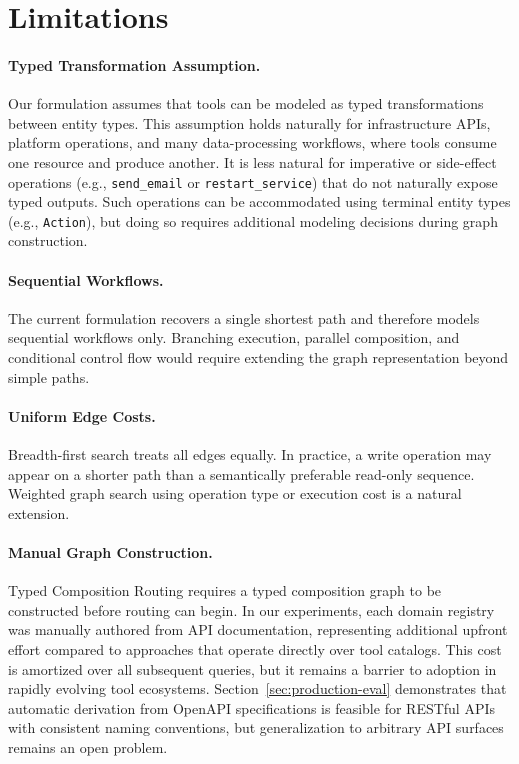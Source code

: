 \section{Limitations}
\label{sec:limitations}

\paragraph{Typed Transformation Assumption.}

Our formulation assumes that tools can be modeled as typed transformations between entity types.
This assumption holds naturally for infrastructure APIs, platform operations, and many data-processing workflows, where tools consume one resource and produce another.
It is less natural for imperative or side-effect operations (e.g., \texttt{send\_email} or \texttt{restart\_service}) that do not naturally expose typed outputs.
Such operations can be accommodated using terminal entity types (e.g., \texttt{Action}), but doing so requires additional modeling decisions during graph construction.

\paragraph{Sequential Workflows.}

The current formulation recovers a single shortest path and therefore models sequential workflows only.
Branching execution, parallel composition, and conditional control flow would require extending the graph representation beyond simple paths.

\paragraph{Uniform Edge Costs.}

Breadth-first search treats all edges equally.
In practice, a write operation may appear on a shorter path than a semantically preferable read-only sequence.
Weighted graph search using operation type or execution cost is a natural extension.

\paragraph{Manual Graph Construction.}

Typed Composition Routing requires a typed composition graph to be constructed before routing can begin.
In our experiments, each domain registry was manually authored from API documentation, representing additional upfront effort compared to approaches that operate directly over tool catalogs.
This cost is amortized over all subsequent queries, but it remains a barrier to adoption in rapidly evolving tool ecosystems.
Section~\ref{sec:production-eval} demonstrates that automatic derivation from OpenAPI specifications is feasible for RESTful APIs with consistent naming conventions, but generalization to arbitrary API surfaces remains an open problem.


